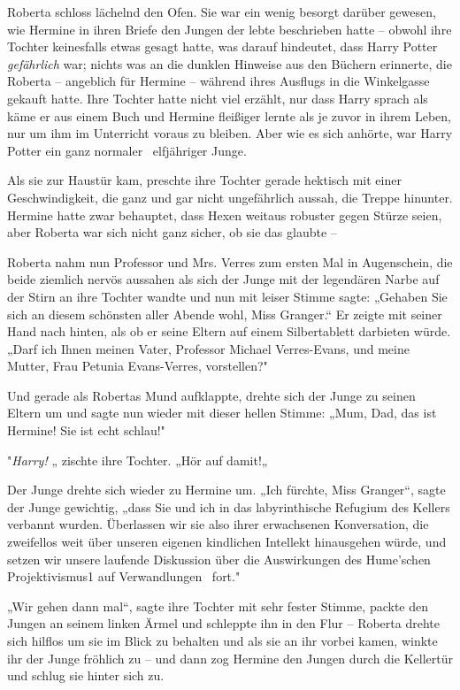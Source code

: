 {Roberta schloss lächelnd den Ofen. Sie war ein wenig besorgt darüber gewesen, wie Hermine in ihren Briefe den Jungen der lebte beschrieben hatte -- obwohl ihre Tochter keinesfalls etwas gesagt hatte, was darauf hindeutet, dass Harry Potter \emph{gefährlich} war; nichts was an die dunklen Hinweise aus den Büchern erinnerte, die Roberta -- angeblich für Hermine -- während ihres Ausflugs in die Winkelgasse gekauft hatte. Ihre Tochter hatte nicht viel erzählt, nur dass Harry sprach als käme er aus einem Buch und Hermine fleißiger lernte als je zuvor in ihrem Leben, nur um ihm im Unterricht voraus zu bleiben. Aber wie es sich anhörte, war Harry Potter ein ganz normaler ~elfjähriger Junge.

Als sie zur Haustür kam, preschte ihre Tochter gerade hektisch mit einer Geschwindigkeit, die ganz und gar nicht ungefährlich aussah, die Treppe hinunter. Hermine hatte zwar behauptet, dass Hexen weitaus robuster gegen Stürze seien, aber Roberta war sich nicht ganz sicher, ob sie das glaubte --

Roberta nahm nun Professor und Mrs. Verres zum ersten Mal in Augenschein, die beide ziemlich nervös aussahen als sich der Junge mit der legendären Narbe auf der Stirn an ihre Tochter wandte und nun mit leiser Stimme sagte: „Gehaben Sie sich an diesem schönsten aller Abende wohl, Miss Granger.“ Er zeigte mit seiner Hand nach hinten, als ob er seine Eltern auf einem Silbertablett darbieten würde. „Darf ich Ihnen meinen Vater, Professor Michael Verres-Evans, und meine Mutter, Frau Petunia Evans-Verres, vorstellen?"

Und gerade als Robertas Mund aufklappte, drehte sich der Junge zu seinen Eltern um und sagte nun wieder mit dieser hellen Stimme: „Mum, Dad, das ist Hermine! Sie ist echt schlau!"

"\emph{Harry!} „ zischte ihre Tochter. „Hör auf damit!„

Der Junge drehte sich wieder zu Hermine um. „Ich fürchte, Miss Granger“, sagte der Junge gewichtig, „dass Sie und ich in das labyrinthische Refugium des Kellers verbannt wurden. Überlassen wir sie also ihrer erwachsenen Konversation, die zweifellos weit über unseren eigenen kindlichen Intellekt hinausgehen würde, und setzen wir unsere laufende Diskussion über die Auswirkungen des Hume'schen Projektivismus1 auf Verwandlungen ~fort."

„Wir gehen dann mal“, sagte ihre Tochter mit sehr fester Stimme, packte den Jungen an seinem linken Ärmel und schleppte ihn in den Flur -- Roberta drehte sich hilflos um sie im Blick zu behalten und als sie an ihr vorbei kamen, winkte ihr der Junge fröhlich zu -- und dann zog Hermine den Jungen durch die Kellertür und schlug sie hinter sich zu.

}
